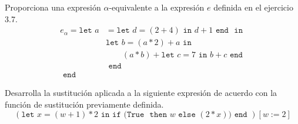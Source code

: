     \begin{exercise}
        Proporciona una expresión $\alpha$-equivalente a la expresión $e$ definida en el ejercicio 3.7.
        \begin{align*}
        	e_\alpha = \texttt{let  }
        		a&= \texttt{let }d = (2 + 4) \texttt{ in } d+1 \texttt{ end }
        		\texttt{ in }\\
        		 &\texttt{let }b=(a \ast 2)+a 
        		 	\texttt{ in } \\
        		 & \qquad(a\ast b) + \texttt{let }c=7 \texttt{ in } 
        		 						b+c 
        		 				\texttt{ end }\\
        		 &\texttt{ end }\\
        	\texttt{ end }&
        \end{align*}
    \end{exercise}

    \begin{exercise}
        Desarrolla la sustitución aplicada a la siguiente expresión de acuerdo con la función de sustitución previamente definida.
        \[
            (\texttt{let } x = (w + 1) * 2 \texttt{ in} \texttt{ if (} \texttt{True } \texttt{ then } w \texttt{ else } (2 * x) \texttt{)} \texttt{ end })[w:=2]
        \]
\end{exercise}

